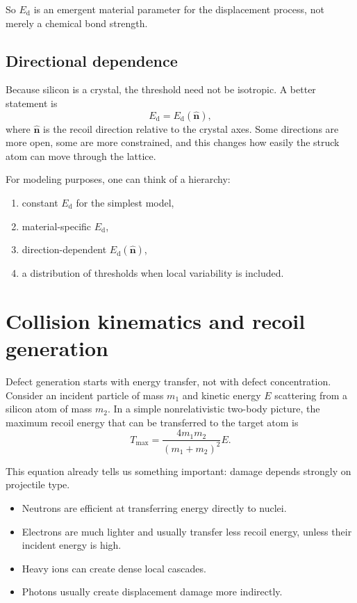 \documentclass[11pt]{article}
\newcommand{\Ed}{E_{\mathrm d}}
\newcommand{\Tmax}{T_{\max}}
\begin{document}
So $\Ed$ is an emergent material parameter for the displacement process, not merely a chemical bond strength.

\subsection{Directional dependence}

Because silicon is a crystal, the threshold need not be isotropic. A better statement is
\begin{equation}
\Ed = \Ed(\hat{\mathbf n}),
\end{equation}
where $\hat{\mathbf n}$ is the recoil direction relative to the crystal axes. Some directions are more open, some are more constrained, and this changes how easily the struck atom can move through the lattice.

For modeling purposes, one can think of a hierarchy:
\begin{enumerate}[label=\arabic*.]
    \item constant $\Ed$ for the simplest model,
    \item material-specific $\Ed$,
    \item direction-dependent $\Ed(\hat{\mathbf n})$,
    \item a distribution of thresholds when local variability is included.
\end{enumerate}

\section{Collision kinematics and recoil generation}

Defect generation starts with energy transfer, not with defect concentration. Consider an incident particle of mass $m_1$ and kinetic energy $E$ scattering from a silicon atom of mass $m_2$. In a simple nonrelativistic two-body picture, the maximum recoil energy that can be transferred to the target atom is
\begin{equation}
\Tmax = \frac{4m_1m_2}{(m_1+m_2)^2} E.
\end{equation}

This equation already tells us something important: damage depends strongly on projectile type.
\begin{itemize}
    \item Neutrons are efficient at transferring energy directly to nuclei.
    \item Electrons are much lighter and usually transfer less recoil energy, unless their incident energy is high.
    \item Heavy ions can create dense local cascades.
    \item Photons usually create displacement damage more indirectly.
\end{itemize}
\end{document}
